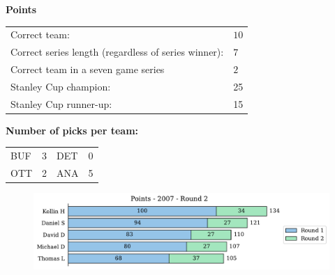\documentclass[10pt]{article}
\begin{document}
{\bf Points}\\
\begin{minipage}{12cm}
    \begin{tabular}{l l}
        Correct team:	& $10$\\
        Correct series length (regardless of series winner):	& $7$\\
        Correct team in a seven game series    & $2$\\
        Stanley Cup champion:	& 25\\
        Stanley Cup runner-up:	& 15\\
    \end{tabular}

    \vspace{1cm}
    {\bf Number of picks per team:}\\
    \begin{tabular}{lc | lc }
        BUF & 3 & DET & 0 \\
        OTT & 2 & ANA & 5 \\
    \end{tabular}
\end{minipage}
\begin{minipage}[t]{13cm}
    \begin{figure}[H]
        \vspace{-2.5cm}
        \includegraphics[width=13cm]{../../figures/2007/Points-2007-Round2.pdf}
    \end{figure}
\end{minipage}
\end{document}
